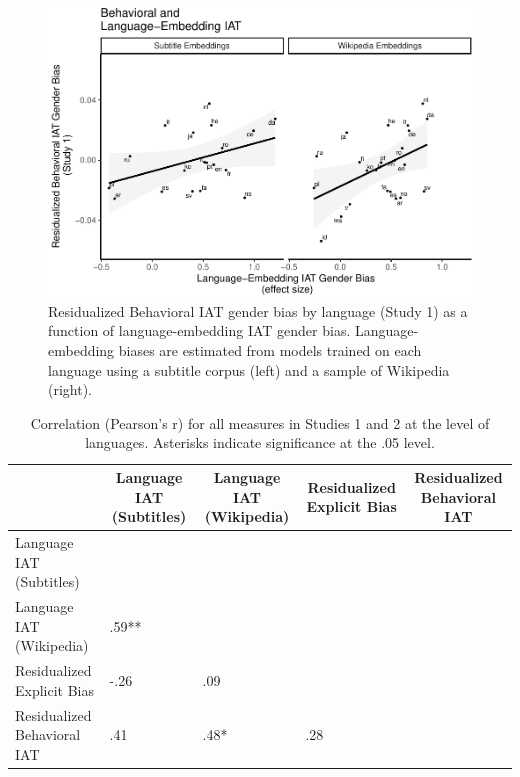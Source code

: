 \documentclass[man]{apa6}
\theoremstyle{definition}
\theoremstyle{definition}
\theoremstyle{definition}
\theoremstyle{remark}
\begin{document}
\begin{figure}
\centering
\includegraphics{iat_lang_files/figure-latex/unnamed-chunk-10-1.pdf}
\caption{\label{fig:unnamed-chunk-10}Residualized Behavioral IAT gender bias
by language (Study 1) as a function of language-embedding IAT gender
bias. Language-embedding biases are estimated from models trained on
each language using a subtitle corpus (left) and a sample of Wikipedia
(right).}
\end{figure}

\begin{table}[tbp]
\begin{center}
\begin{threeparttable}
\caption{\label{tab:coding-table}Correlation (Pearson's r) for all measures in Studies 1 and 2 at the level of languages. Asterisks indicate significance at the .05 level.}
\tiny{
\begin{tabular}{lllll}
\toprule
 & \multicolumn{1}{c}{Language IAT (Subtitles)} & \multicolumn{1}{c}{Language IAT (Wikipedia)} & \multicolumn{1}{c}{Residualized Explicit Bias} & \multicolumn{1}{c}{Residualized Behavioral IAT}\\
\midrule
Language IAT (Subtitles) &  &  &  & \\
Language IAT (Wikipedia) & .59** &  &  & \\
Residualized Explicit Bias & -.26 & .09 &  & \\
Residualized Behavioral IAT & .41 & .48* & .28 & \\
\bottomrule
\end{tabular}
}
\end{threeparttable}
\end{center}
\end{table}
\end{document}
